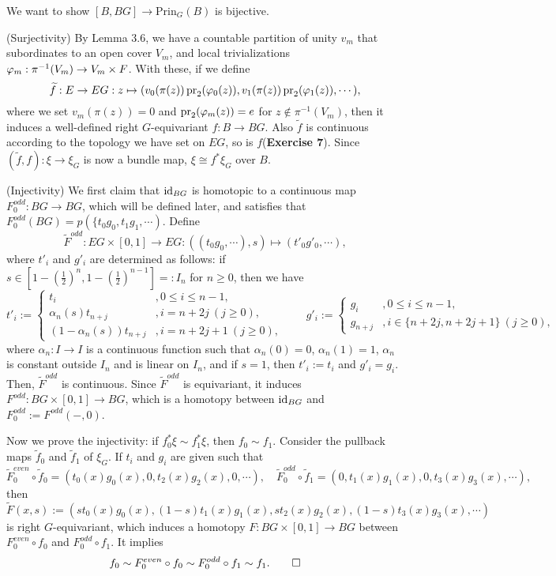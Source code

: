 \documentclass{../../../small}
\begin{document}
\begin{pf}
We want to show $[B,BG]\to\mathrm{Prin}_G(B)$ is bijective.

(Surjectivity)
By Lemma 3.6, we have a countable partition of unity $v_m$ that subordinates to an open cover $V_m$, and local trivializations $\varphi_m:\pi^{-1}(V_m)\to V_m\times F$.
With these, if we define
\[\widetilde f:E\to EG:z\mapsto(v_0(\pi(z))\operatorname{pr}_2(\varphi_0(z)),v_1(\pi(z))\operatorname{pr}_2(\varphi_1(z)),\cdots),\]
where we set $v_m(\pi(z))=0$ and $\operatorname{pr}_2(\varphi_m(z))=e$ for $z\notin\pi^{-1}(V_m)$,
then it induces a well-defined right $G$-equivariant $f:B\to BG$.
Also $\tilde f$ is continuous according to the topology we have set on $EG$, so is $f$(\textbf{Exercise 7}).
Since $(\tilde f,f):\xi\to \xi_G$ is now a bundle map, $\xi\cong f^*\xi_G$ over $B$.

(Injectivity)
We first claim that $\operatorname{id}_{BG}$ is homotopic to a continuous map $F_0^{odd}:BG\to BG$, which will be defined later, and satisfies that $F_0^{odd}(BG)=p(\{t_0g_0,t_1g_1,\cdots)$.
Define
\[\tilde F^{odd}:EG\times[0,1]\to EG:((t_0g_0,\cdots),s)\mapsto(t'_0g'_0,\cdots),\]
where $t'_i$ and $g'_i$ are determined as follows: if $s\in[1-(\frac12)^n,1-(\frac12)^{n-1}]=:I_n$ for $n\ge0$, then we have
\[t'_i:=\begin{cases}t_i&,0\le i\le n-1,\\\alpha_n(s)t_{n+j}&,i=n+2j\ (j\ge0),\\(1-\alpha_n(s))t_{n+j}&,i=n+2j+1\ (j\ge0),\end{cases}\qquad g'_i:=\begin{cases}g_i&,0\le i\le n-1,\\g_{n+j}&,i\in\{n+2j,n+2j+1\}\ (j\ge0),\end{cases}\]
where $\alpha_n:I\to I$ is a continuous function such that $\alpha_n(0)=0$, $\alpha_n(1)=1$, $\alpha_n$ is constant outside $I_n$ and is linear on $I_n$, and if $s=1$, then $t'_i:=t_i$ and $g'_i=g_i$.
Then, $\tilde F^{odd}$ is continuous.
Since $\tilde F^{odd}$ is equivariant, it induces $F^{odd}:BG\times[0,1]\to BG$, which is a homotopy between $\operatorname{id}_{BG}$ and $F_0^{odd}:=F^{odd}(-,0)$.

Now we prove the injectivity: if $f_0^*\xi\sim f_1^*\xi$, then $f_0\sim f_1$.
Consider the pullback maps $\tilde f_0$ and $\tilde f_1$ of $\xi_G$.
If $t_i$ and $g_i$ are given such that
\[\tilde F_0^{even}\circ\tilde f_0=(t_0(x)g_0(x),0,t_2(x)g_2(x),0,\cdots),\quad\tilde F_0^{odd}\circ\tilde f_1=(0,t_1(x)g_1(x),0,t_3(x)g_3(x),\cdots),\]
then
\[\tilde F(x,s):=(st_0(x)g_0(x),(1-s)t_1(x)g_1(x),st_2(x)g_2(x),(1-s)t_3(x)g_3(x),\cdots)\]
is right $G$-equivariant, which induces a homotopy $F:BG\times[0,1]\to BG$ between $F_0^{even}\circ f_0$ and $F_0^{odd}\circ f_1$.
It implies
\[f_0\sim F_0^{even}\circ f_0\sim F_0^{odd}\circ f_1\sim f_1.\qedhere\]
\end{pf}
\end{document}

